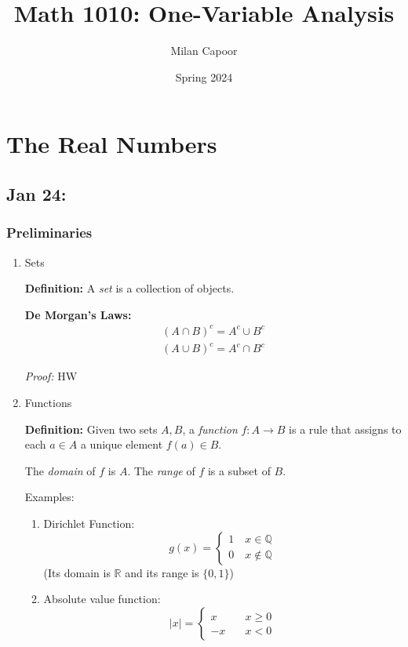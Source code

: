 \documentclass[12pt]{report}
\title{Math 1010: One-Variable Analysis}
\author{Milan Capoor}
\date{Spring 2024}
\newcommand{\R}{\mathbb{R}}
\newcommand{\Q}{\mathbb{Q}}
\newcommand{\abs}[1]{\left\vert #1 \right\vert}
\begin{document}
\maketitle
\chapter{The Real Numbers}
\section{Jan 24:} 
    \subsection*{Preliminaries}
        \begin{enumerate}
            \item Sets
            
            \textbf{Definition:} A \emph{set} is a collection of objects.

            \textbf{De Morgan's Laws:}
            \begin{align*}
                (A \cap B)^c  = A^c \cup B^c\\
                (A \cup B)^c = A^c \cap B^c
            \end{align*}

            \emph{Proof:} HW

            \item Functions
            
            \textbf{Definition:} Given two sets $A, B$, a \emph{function} $f: A \to B$ is a rule that assigns to each $a \in A$ a unique element $f(a) \in B$.

            The \emph{domain} of $f$ is $A$. The \emph{range} of $f$ is a subset of $B$.

            Examples:
            \begin{enumerate}
                \item Dirichlet Function:
                \[g(x) = \begin{cases}
                    1 \quad x \in \Q\\
                    0 \quad x \notin \Q
                \end{cases}\]
                (Its domain is $\R$ and its range is $\{0, 1\}$)

                \item Absolute value function:
                \[\abs{x} = \begin{cases}
                    x \quad &x \geq 0\\
                    -x \quad &x < 0
                \end{cases}\]


\end{enumerate}
\end{enumerate}
\end{document}
